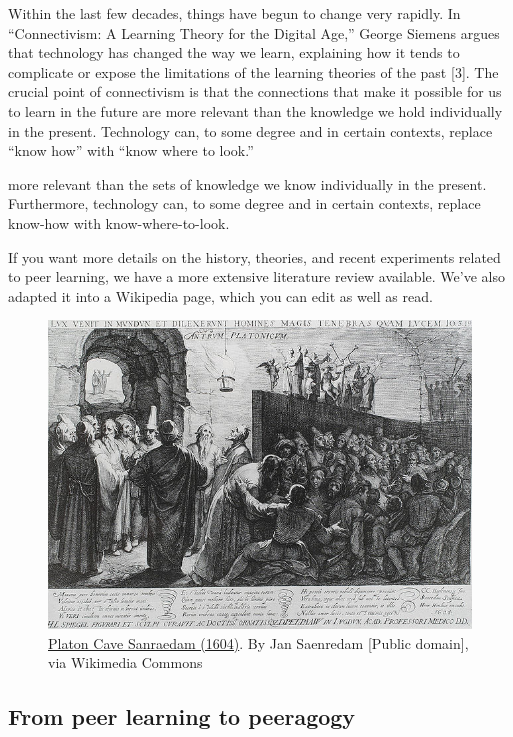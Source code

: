 Within the last few decades, things have begun to change very rapidly.
In ``Connectivism: A Learning Theory for the Digital Age,'' George
Siemens argues that technology has changed the way we learn, explaining
how it tends to complicate or expose the limitations of the learning
theories of the past {[}3{]}. The crucial point of connectivism is that
the connections that make it possible for us to learn in the future are
more relevant than the knowledge we hold individually in the present.
Technology can, to some degree and in certain contexts, replace ``know
how'' with ``know where to look.''

more relevant than the sets of knowledge we know individually in the
present. Furthermore, technology can, to some degree and in certain
contexts, replace know-how with know-where-to-look.

If you want more details on the history, theories, and recent
experiments related to peer learning, we have a more extensive
literature review available. We've also adapted it into a Wikipedia
page, which you can edit as well as read.

\begin{figure}
\begin{center}
\includegraphics[width=.8\textwidth]{../pictures/plato_cave.jpg}
\end{center}
\caption*{\href{http://commons.wikimedia.org/w/index.php?title=File:Platon\_Cave\_Sanraedam\_1604.jpg\&oldid=68567627}{Platon Cave Sanraedam (1604)}. By Jan Saenredam {[}Public domain{]}, via
Wikimedia Commons}
\end{figure}

\subsection{From peer learning to peeragogy}

